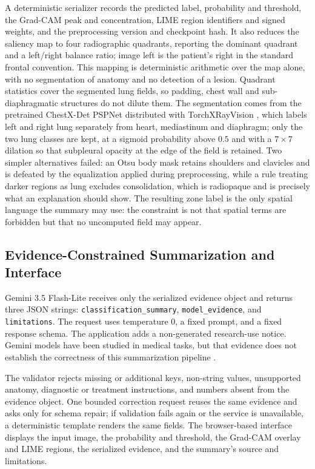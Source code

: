\documentclass[conference]{IEEEtran}
\begin{document}
A deterministic serializer records the predicted label, probability and
threshold, the Grad-CAM peak and concentration, LIME region identifiers and
signed weights, and the preprocessing version and checkpoint hash. It also reduces the saliency map to four radiographic
quadrants, reporting the dominant quadrant and a left/right balance ratio;
image left is the patient's right in the standard frontal convention. This
mapping is deterministic arithmetic over the map alone, with no segmentation
of anatomy and no detection of a lesion. Quadrant statistics cover the
segmented lung fields, so padding, chest wall and sub-diaphragmatic
structures do not dilute them. The segmentation comes from the
pretrained ChestX-Det PSPNet distributed with TorchXRayVision
\cite{cohen2022torchxrayvision}, which labels left and right lung
separately from heart, mediastinum and diaphragm; only the two lung classes
are kept, at a sigmoid probability above $0.5$ and with a $7\times7$
dilation so that subpleural opacity at the edge of the field is retained. Two simpler alternatives failed: an Otsu body mask retains shoulders and
clavicles and is defeated by the equalization applied during preprocessing,
while a rule treating darker regions as lung excludes consolidation, which
is radiopaque and is precisely what an explanation should show. The resulting zone label is the only spatial language the summary may use:
the constraint is not that spatial terms are forbidden but that no
uncomputed field may appear.

\subsection{Evidence-Constrained Summarization and Interface}
Gemini 3.5 Flash-Lite receives only the serialized evidence object and returns three JSON strings: \texttt{classification\_summary}, \texttt{model\_evidence}, and \texttt{limitations}. The request uses temperature $0$, a fixed prompt, and a fixed response schema. The application adds a non-generated research-use notice. Gemini models have been studied in medical tasks, but that evidence does not establish the correctness of this summarization pipeline \cite{saab2024gemini}.

The validator rejects missing or additional keys, non-string values, unsupported anatomy, diagnostic or treatment instructions, and numbers absent from the evidence object. One bounded correction request reuses the same evidence and asks only for schema repair; if validation fails again or the service is unavailable, a deterministic template renders the same fields. The browser-based interface displays the input image, the probability and threshold, the Grad-CAM overlay and LIME regions, the serialized evidence, and the summary's source and limitations.
\end{document}
